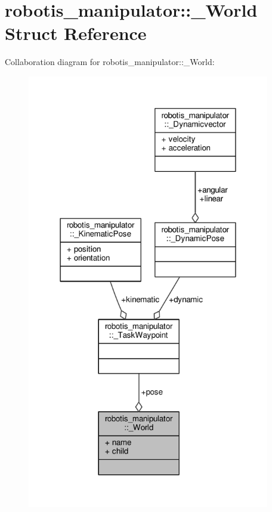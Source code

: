 \hypertarget{structrobotis__manipulator_1_1___world}{}\section{robotis\+\_\+manipulator\+:\+:\+\_\+\+World Struct Reference}
\label{structrobotis__manipulator_1_1___world}


Collaboration diagram for robotis\+\_\+manipulator\+:\+:\+\_\+\+World\+:
\nopagebreak
\begin{figure}[H]
\begin{center}
\leavevmode
\includegraphics[width=300pt]{structrobotis__manipulator_1_1___world__coll__graph}
\end{center}
\end{figure}
